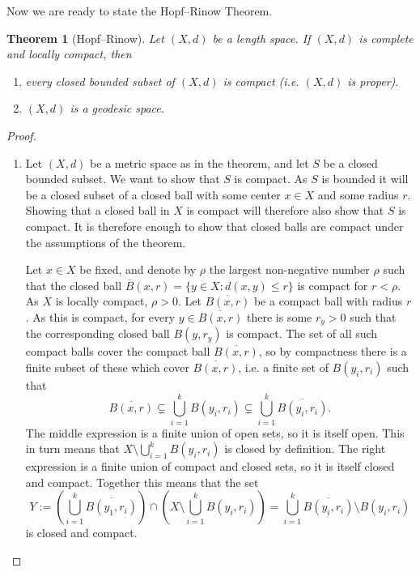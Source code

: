 \documentclass[11pt, a4paper, oneside]{memoir}
\theoremstyle{plain}\newtheorem{theorem}[subsection]{Theorem}
\theoremstyle{definition}
\newcommand{\parenum}{\setenumerate[1]{label=\textbf{(\arabic*)}}}
\begin{document}
Now we are ready to state the Hopf--Rinow Theorem.
\begin{theorem}[Hopf--Rinow]\label{thm:Hopf_Rinow}
Let \((X,d)\) be a length space.
If \((X,d)\) is complete and locally compact, then
\begin{enumerate}
    \item every closed bounded subset of \((X,d)\) is compact (i.e. \((X,d)\) is proper).
    \item \((X,d)\) is a geodesic space.
\end{enumerate} 
\end{theorem} %
\begin{proof}


\parenum
\begin{enumerate}
\item Let \((X,d)\) be a metric space as in the theorem, and let \(S\) be a closed bounded subset.
We want to show that \(S\) is compact.
As \(S\) is bounded it will be a closed subset of a closed ball with some center \(x\in X\) and some radius \(r\).
Showing that a closed ball in \(X\) is compact will therefore also show that \(S\) is compact.
It is therefore enough to show that closed balls are compact under the assumptions of the theorem.

Let \(x\in X\) be fixed, and denote by \(\rho\) the largest non-negative number \(\rho\) such that the closed ball \(\overline{B}(x,r)=\{y\in X:d(x,y)\leq r\}\) is compact for \(r<\rho\).
As \(X\) is locally compact, \(\rho>0\).
Let \(\overline{B(x,r)}\) be a compact ball with radius \(r\).
As this is compact, for every \(y\in \overline{B(x,r)}\) there is some \(r_y>0\) such that the corresponding closed ball \(B(y,r_y)\) is compact.
The set of all such compact balls cover the compact ball \(\overline{B(x,r)}\), so by compactness there is a finite subset of these which cover \(\overline{B(x,r)}\), i.e. a finite set of \(B(y_i,r_i)\) such that 
\[\overline{B(x,r)}\subsetneq \bigcup_{i=1}^k B(y_i,r_i)\subsetneq \bigcup_{i=1}^k\overline{B(y_i,r_i)}.\]
The middle expression is a finite union of open sets, so it is itself open.
This in turn means that \(X\setminus \bigcup_{i=1}^k B(y_i,r_i)\) is closed by definition.
The right expression is a finite union of compact and closed sets, so it is itself closed and compact.
Together this means that the set
\[Y:=\left(\bigcup_{i=1}^k\overline{B(y_1,r_i)}\right)\cap\left(X\setminus\bigcup_{i=1}^k B(y_i,r_i)\right)
=\bigcup_{i=1}^k\overline{B(y_i,r_i)}\setminus B(y_i,r_i)\]
is closed and compact.


\end{enumerate}
\end{proof}
\end{document}
